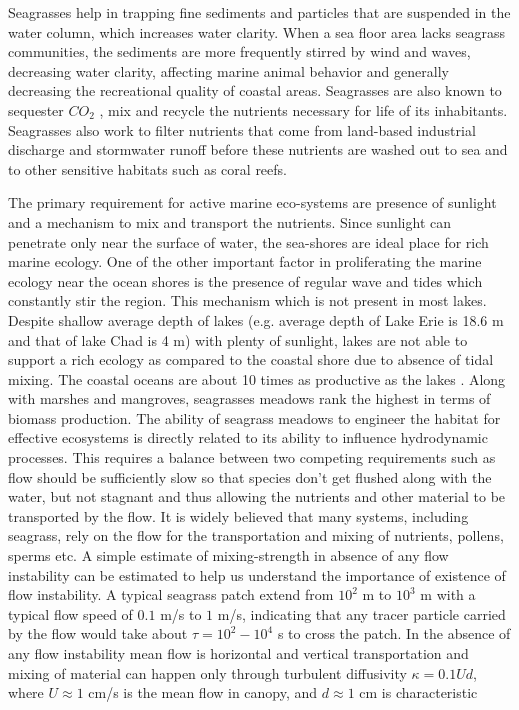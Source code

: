 \documentclass[12pt]{report}   %
\begin{document}
Seagrasses help in trapping fine sediments and particles that are suspended in the water column, which increases water clarity. When a sea floor area lacks seagrass communities, the sediments are more frequently stirred by wind and waves, decreasing water clarity, affecting marine animal behavior and generally decreasing the recreational quality of coastal areas. Seagrasses are also known to sequester $C O_2$ \cite{duarte2005}, mix and recycle the nutrients necessary for life of its inhabitants. Seagrasses also work to filter nutrients that come from land-based industrial discharge and stormwater runoff before these nutrients are washed out to sea and to other sensitive habitats such as coral reefs.

The primary requirement for active marine eco-systems are presence of sunlight and a mechanism to mix and transport the nutrients. Since sunlight can penetrate only near the surface of water, the sea-shores are ideal place for rich marine ecology. One of the other important factor in proliferating the marine ecology near the ocean shores is the presence of regular wave and tides which constantly stir the region. This mechanism which is not present in most lakes. Despite shallow average depth of lakes (e.g. average depth of Lake Erie is 18.6 m and that of lake Chad is 4 m) with plenty of sunlight, lakes are not able to support a rich ecology as compared to the coastal shore due to absence of tidal mixing. The coastal oceans are about 10 times as productive as the lakes \cite{nixon1988}. Along with marshes and mangroves, seagrasses meadows rank the highest in terms of biomass production.
\newline
The ability of seagrass meadows to engineer the habitat for effective ecosystems is directly related to its ability to influence hydrodynamic processes. This requires a balance between
two competing requirements such as flow should be sufficiently slow so that species don't get flushed along with the water, but not stagnant and thus allowing the nutrients and other material to be transported by the flow. It is widely believed that many systems, including seagrass, rely on the flow for the transportation and mixing of nutrients, pollens, sperms etc. A simple estimate of mixing-strength in absence of any flow instability can be estimated to help us understand the importance of existence of flow instability. A typical seagrass patch extend from $10^2$ m to $10^3$ m with a typical flow speed of $0.1$ m/s to $1$ m/s, indicating that any tracer particle carried by the flow would take about $\tau = 10^2-10^4$ s to cross the patch. In the absence of any flow instability mean flow is horizontal and vertical transportation and mixing of material can happen only through turbulent diffusivity $\kappa =  0.1 U d$, where $ U \approx 1$ cm/s is the mean flow in canopy, and $d \approx 1$ cm is characteristic 
\end{document}
